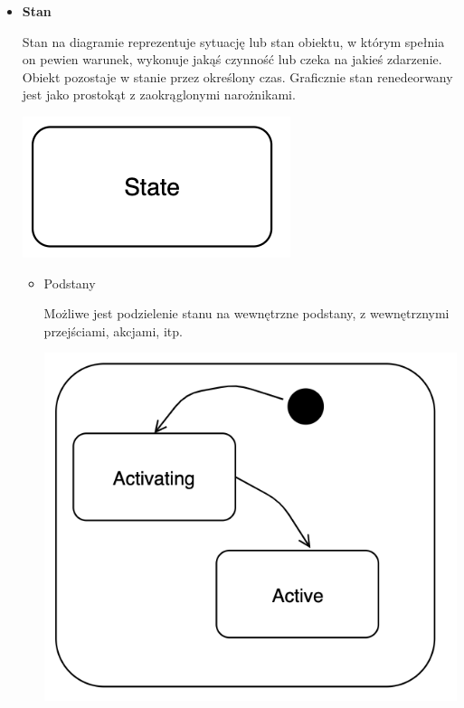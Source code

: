 \documentclass[12pt]{article}
\begin{document}
                \begin{itemize}
                    \item \textbf{Stan}

                        Stan na diagramie reprezentuje sytuację lub stan obiektu,
                        w którym spełnia on pewien warunek, wykonuje jakąś czynność lub czeka
                        na jakieś zdarzenie. Obiekt pozostaje w stanie przez określony czas.
                        Graficznie stan renedeorwany jest jako 
                        prostokąt z zaokrąglonymi narożnikami.

                        \begin{center}
                            \includegraphics[scale=0.60]{state-diagram/state.png}
                        \end{center}

                        \begin{itemize}
                            \item Podstany

                                Możliwe jest podzielenie stanu na wewnętrzne podstany,
                                z wewnętrznymi przejściami, akcjami, itp.

                            \begin{center}
                                \includegraphics[scale=0.50]{state-diagram/substate.png}
                            \end{center}


\end{itemize}
\end{itemize}
\end{document}

